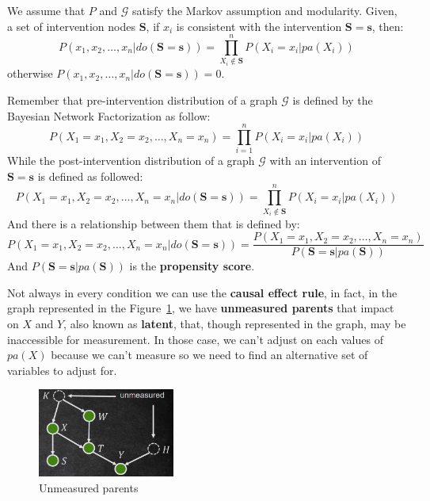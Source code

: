 \begin{definition}
      We assume that $P$ and $\mathcal{G}$ satisfy the Markov assumption and modularity.
      Given, a set of intervention nodes $\mathbf{S}$, if $x_i$ is consistent
      with the intervention $\mathbf{S} = \mathbf{s}$, then:
      \begin{equation}
            P(x_1, x_2, \dots, x_n| do(\mathbf{S} = \mathbf{s})) = \prod_{X_i \not \in \mathbf{S}}^{n} P(X_i = x_i | pa(X_i))
      \end{equation}
      otherwise $P(x_1, x_2, \dots, x_n| do(\mathbf{S} = \mathbf{s})) = 0$.
\end{definition}

\begin{note}
      Remember that pre-intervention distribution of a graph $\mathcal{G}$ is
      defined by the Bayesian Network Factorization as follow:
      \begin{equation*}
            P(X_1 = x_1, X_2 = x_2, \dots, X_n = x_n) = \prod_{i = 1}^{n} P(X_i = x_i | pa(X_i))
      \end{equation*}
      While the post-intervention distribution of a graph $\mathcal{G}$ with an
      intervention of $\mathbf{S} = \mathbf{s}$ is defined as followed:
      \begin{equation*}
            P(X_1 = x_1, X_2 = x_2, \dots, X_n = x_n | do(\mathbf{S} = \mathbf{s})) = \prod_{X_i \not \in \mathbf{S}}^{n} P(X_i = x_i | pa(X_i))
      \end{equation*}
      And there is a relationship between them that is defined by:
      \begin{equation*}
            P(X_1 = x_1, X_2 = x_2, \dots, X_n = x_n | do(\mathbf{S} = \mathbf{s})) = \frac{P(X_1 = x_1, X_2 = x_2, \dots, X_n = x_n)}{P(\mathbf{S} = \mathbf{s} | pa(\mathbf{S}))}
      \end{equation*}
      And $P(\mathbf{S} = \mathbf{s} | pa(\mathbf{S}))$ is the \textbf{propensity score}.
\end{note}

Not always in every condition we can use the \textbf{causal effect rule}, in fact,
in the graph represented in the Figure~\ref{fig:unmeasured_parents}, we have
\textbf{unmeasured parents} that impact on $X$ and $Y$, also known as \textbf{latent},
that, though represented in the graph, may be inaccessible for measurement. In
those case, we can't adjust on each values of $pa(X)$ because we can't measure
so we need to find an alternative set of variables to adjust for.
\begin{figure}[!ht]
      \centering
      \includegraphics[width=0.4\textwidth]{img/causal_models/unmeasured_parents.png}
      \caption{Unmeasured parents}
      \label{fig:unmeasured_parents}
\end{figure}

